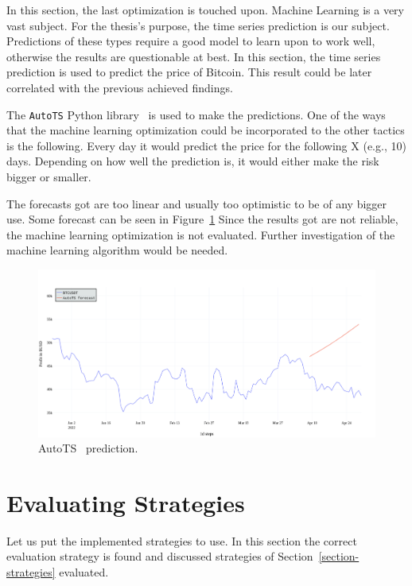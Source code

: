 In this section, the last optimization is touched upon. Machine Learning is a very vast subject. For the thesis's purpose, the time series prediction is our subject. Predictions of these types require a good model to learn upon to work well, otherwise the results are questionable at best. In this section, the time series prediction is used to predict the price of Bitcoin. This result could be later correlated with the previous achieved findings.

The \texttt{AutoTS} Python library~\cite{autots} is used to make the predictions. One of the ways that the machine learning optimization could be incorporated to the other tactics is the following. Every day it would predict the price for the following X (e.g., 10) days. Depending on how well the prediction is, it would either make the risk bigger or smaller.

The forecasts got are too linear and usually too optimistic to be of any bigger use. Some forecast can be seen in Figure~\ref{figure-autots-prediction}
Since the results got are not reliable, the machine learning optimization is not evaluated. Further investigation of the machine learning algorithm would be needed.

\begin{figure}[!hbt]
    \centering
    \includegraphics[width=\columnwidth]{figures/autots-prediction.png}
    \caption{AutoTS~\cite{autots} prediction.}
    \label{figure-autots-prediction}
\end{figure}

\section{Evaluating Strategies}
Let us put the implemented strategies to use. In this section the correct evaluation strategy is found and discussed strategies of Section~\ref{section-strategies} evaluated.

